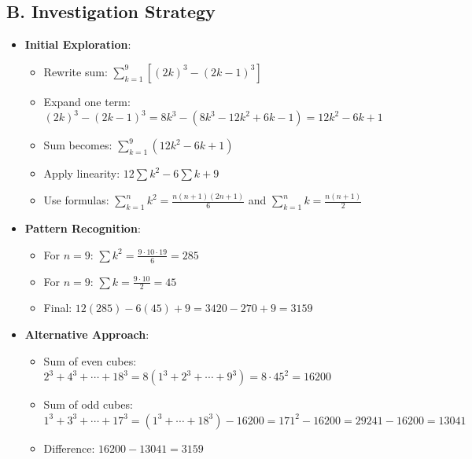 \documentclass[12pt]{article}
\begin{document}
\begin{strategicbox}
\subsection*{B. Investigation Strategy}
\begin{itemize}[leftmargin=*]
    \item \textbf{Initial Exploration}: 
    \begin{itemize}
        \item Rewrite sum: $\sum_{k=1}^{9} [(2k)^3 - (2k-1)^3]$
        \item Expand one term: $(2k)^3 - (2k-1)^3 = 8k^3 - (8k^3 - 12k^2 + 6k - 1) = 12k^2 - 6k + 1$
        \item Sum becomes: $\sum_{k=1}^{9} (12k^2 - 6k + 1)$
        \item Apply linearity: $12\sum k^2 - 6\sum k + 9$
        \item Use formulas: $\sum_{k=1}^{n} k^2 = \frac{n(n+1)(2n+1)}{6}$ and $\sum_{k=1}^{n} k = \frac{n(n+1)}{2}$
    \end{itemize}
    \item \textbf{Pattern Recognition}: 
    \begin{itemize}
        \item For $n=9$: $\sum k^2 = \frac{9 \cdot 10 \cdot 19}{6} = 285$
        \item For $n=9$: $\sum k = \frac{9 \cdot 10}{2} = 45$
        \item Final: $12(285) - 6(45) + 9 = 3420 - 270 + 9 = 3159$
    \end{itemize}
    \item \textbf{Alternative Approach}: 
    \begin{itemize}
        \item Sum of even cubes: $2^3 + 4^3 + \cdots + 18^3 = 8(1^3 + 2^3 + \cdots + 9^3) = 8 \cdot 45^2 = 16200$
        \item Sum of odd cubes: $1^3 + 3^3 + \cdots + 17^3 = (1^3 + \cdots + 18^3) - 16200 = 171^2 - 16200 = 29241 - 16200 = 13041$
        \item Difference: $16200 - 13041 = 3159$
    \end{itemize}
\end{itemize}


\end{strategicbox}
\end{document}
